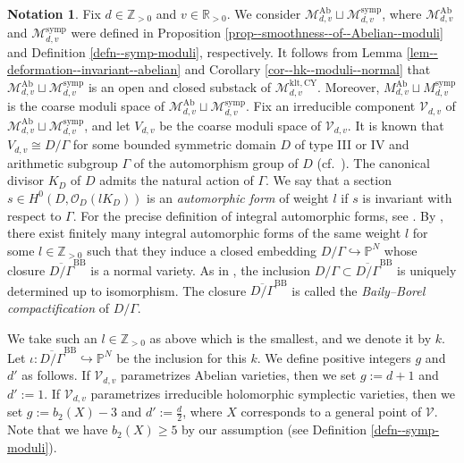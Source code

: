 \documentclass[12pt,twoside]{amsart}
\theoremstyle{definition}
\newtheorem{note}[thm]{Notation}
\begin{document}
\begin{note}\label{setup--modulipart}
Fix $d\in\mathbb{Z}_{>0}$ and $v\in\mathbb{R}_{>0}$. 
We consider $\mathcal{M}_{d,v}^{\mathrm{Ab}}\sqcup\mathcal{M}_{d,v}^{\mathrm{symp}}$, where $\mathcal{M}_{d,v}^{\mathrm{Ab}}$ and $\mathcal{M}_{d,v}^{\mathrm{symp}}$ were defined in Proposition \ref{prop--smoothness--of--Abelian--moduli} and Definition \ref{defn--symp-moduli}, respectively.
It follows from Lemma \ref{lem--deformation--invariant--abelian} and Corollary \ref{cor--hk--moduli--normal} that $\mathcal{M}_{d,v}^{\mathrm{Ab}}\sqcup\mathcal{M}_{d,v}^{\mathrm{symp}}$ is an open and closed substack of $\mathcal{M}_{d,v}^{\mathrm{klt},\mathrm{CY}}$.
Moreover, $M_{d,v}^{\mathrm{Ab}}\sqcup M_{d,v}^{\mathrm{symp}}$ is the coarse moduli space of $\mathcal{M}_{d,v}^{\mathrm{Ab}}\sqcup\mathcal{M}_{d,v}^{\mathrm{symp}}$.
    Fix an irreducible component $\mathcal{V}_{d,v}$ of $\mathcal{M}_{d,v}^{\mathrm{Ab}}\sqcup\mathcal{M}_{d,v}^{\mathrm{symp}}$, and let $V_{d,v}$ be the coarse moduli space of $\mathcal{V}_{d,v}$.  
It is known that $V_{d,v} \cong D/\Gamma$ for some bounded symmetric domain $D$ of type III or IV and arithmetic subgroup $\Gamma$ of the automorphism group of $D$ (cf.~\cite[Section 2]{fujino--canonical-certain}).
The canonical divisor $K_D$ of $D$ admits the natural action of $\Gamma$. 
We say that a section $s\in H^0(D,\mathcal{O}_D(lK_D))$ is an {\it automorphic form} of weight $l$ if $s$ is invariant with respect to $\Gamma$.
For the precise definition of integral automorphic forms, see \cite[Subsection 8.5]{BB}.
By \cite{BB}, there exist finitely many integral automorphic forms of the same weight $l$ for some $l\in\mathbb{Z}_{>0}$ such that they induce a closed embedding $ D/\Gamma\hookrightarrow \mathbb{P}^N$ whose closure $\overline{ D/\Gamma}^{\mathrm{BB}}$ is a normal variety.
As in \cite[Subsection 2.5]{fujino--canonical-certain}, the inclusion $ D/\Gamma\subset\overline{ D/\Gamma}^{\mathrm{BB}}$ is uniquely determined up to isomorphism. 
The closure $\overline{ D/\Gamma}^{\mathrm{BB}}$ is called the {\it Baily--Borel compactification} of $ D/\Gamma$. 

We take such an $l\in\mathbb{Z}_{>0}$ as above which is the smallest, and we denote it by $k$.
Let $\iota\colon \overline{ D/\Gamma}^{\mathrm{BB}}\hookrightarrow \mathbb{P}^N$ be the inclusion for this $k$.
We define positive integers $g$ and $d'$ as follows.
If $\mathcal{V}_{d,v}$ parametrizes Abelian varieties, then we set $g:=d+1$ and $d':=1$.
If $\mathcal{V}_{d,v}$ parametrizes irreducible holomorphic symplectic varieties, then we set $g:=b_2(X)-3$ and $d':=\frac{d}{2}$, where $X$ corresponds to a general point of $\mathcal{V}$.
Note that we have $b_2(X)\ge5$ by our assumption (see Definition \ref{defn--symp-moduli}). 
\end{note}
\end{document}
